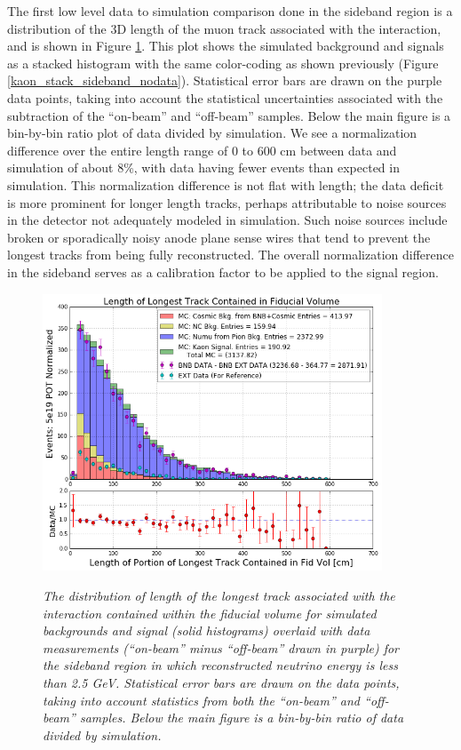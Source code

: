 The first low level data to simulation comparison done in the sideband region is a distribution of the 3D length of the muon track associated with the interaction, and is shown in Figure \ref{kaon_sideband_comp_tracklength}. This plot shows the simulated background and signals as a stacked histogram with the same color-coding as shown previously (Figure \ref{kaon_stack_sideband_nodata}). Statistical error bars are drawn on the purple data points, taking into account the statistical uncertainties associated with the subtraction of the ``on-beam'' and ``off-beam'' samples.  Below the main figure is a bin-by-bin ratio plot of data divided by simulation. We see a normalization difference over the entire length range of 0 to 600 cm between data and simulation of about 8\%, with data having fewer events than expected in simulation. This normalization difference is not flat with length; the data deficit is more prominent for longer length tracks, perhaps attributable to noise sources in the detector not adequately modeled in simulation. Such noise sources include broken or sporadically noisy anode plane sense wires that tend to prevent the longest tracks from being fully reconstructed. The overall normalization difference in the sideband serves as a calibration factor to be applied to the signal region.\\


\begin{figure}[ht!]
\centering
	\includegraphics[width=0.9\textwidth]{Figures/kaon_sideband_comp_tracklength.png} \\
\caption{\textit{The distribution of length of the longest track associated with the interaction contained within the fiducial volume for simulated backgrounds and signal (solid histograms) overlaid with data measurements (``on-beam'' minus ``off-beam'' drawn in purple) for the sideband region in which reconstructed neutrino energy is less than 2.5 GeV. Statistical error bars are drawn on the data points, taking into account statistics from both the ``on-beam'' and ``off-beam'' samples. Below the main figure is a bin-by-bin ratio of data divided by simulation.}}\label{kaon_sideband_comp_tracklength}
\end{figure}

